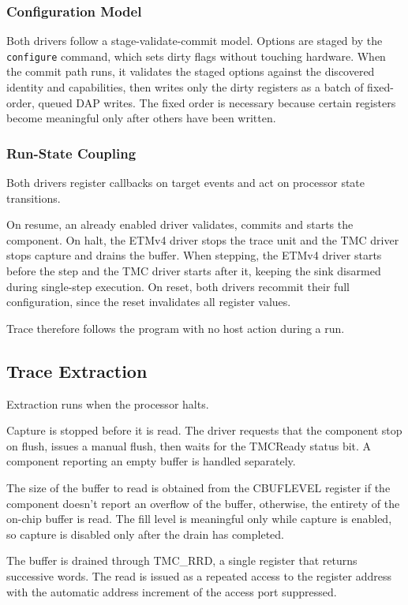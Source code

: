 \subsubsection{Configuration Model}
Both drivers follow a stage-validate-commit model. Options are staged by the \texttt{configure} command, which sets dirty flags without touching hardware. When the commit path runs, it validates the staged options against the discovered identity and capabilities, then writes only the dirty registers as a batch of fixed-order, queued DAP writes. The fixed order is necessary because certain registers become meaningful only after others have been written.

\subsubsection{Run-State Coupling}
Both drivers register callbacks on target events and act on processor state transitions.

On resume, an already enabled driver validates, commits and starts the component. On halt, the ETMv4 driver stops the trace unit and the TMC driver stops capture and drains the buffer. When stepping, the ETMv4 driver starts before the step and the TMC driver starts after it, keeping the sink disarmed during single-step execution. On reset, both drivers recommit their full configuration, since the reset invalidates all register values.

Trace therefore follows the program with no host action during a run.


\subsection{Trace Extraction}
Extraction runs when the processor halts.

Capture is stopped before it is read. The driver requests that the component stop on flush, issues a manual flush, then waits for the TMCReady status bit. A component reporting an empty buffer is handled separately.

The size of the buffer to read is obtained from the CBUFLEVEL register if the component doesn't report an overflow of the buffer, otherwise, the entirety of the on-chip buffer is read. The fill level is meaningful only while capture is enabled, so capture is disabled only after the drain has completed.

The buffer is drained through TMC\_RRD, a single register that returns successive words. The read is issued as a repeated access to the register address with the automatic address increment of the access port suppressed.

